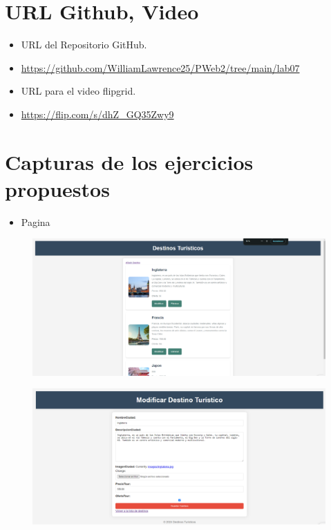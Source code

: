 \documentclass{article}
\begin{document}
	\section{URL Github, Video}
	\begin{itemize}
		\item URL del Repositorio GitHub.
		\item \url{https://github.com/WilliamLawrence25/PWeb2/tree/main/lab07}
		\item URL para el video flipgrid.
		\item \url{https://flip.com/s/dhZ_GQ35Zwy9}	
	
	\end{itemize}
	\clearpage	
	
	\section{Capturas de los ejercicios propuestos}
	
	\begin{itemize}
		\item Pagina
	\end{itemize}
	\begin{figure}[H]
		\centering
		\includegraphics[width=1.0\textwidth, keepaspectratio]{img/pagina1}
	\end{figure}
	
	\begin{figure}[H]
		\centering
		\includegraphics[width=1.0\textwidth, keepaspectratio]{img/pagina2}
	\end{figure}
	
\end{document}
